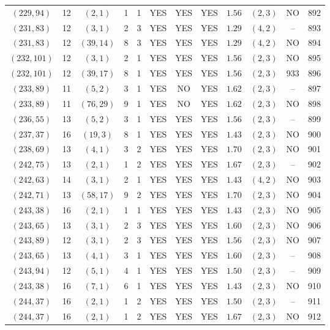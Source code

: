 \begin{longtable}{|c|c|c|c|c|c|c|c|c|c|c|c|}
$(229,94)$ & 12 & $(2,1)$ & 1 & 1 & YES & YES & YES & $1.56$ & $(2,3)$ & NO & 892\\
$(231,83)$ & 12 & $(3,1)$ & 2 & 3 & YES & YES & YES & $1.29$ & $(4,2)$ & -- & 893\\
$(231,83)$ & 12 & $(39,14)$ & 8 & 3 & YES & YES & YES & $1.29$ & $(4,2)$ & NO & 894\\
$(232,101)$ & 12 & $(3,1)$ & 2 & 1 & YES & YES & YES & $1.56$ & $(2,3)$ & NO & 895\\
$(232,101)$ & 12 & $(39,17)$ & 8 & 1 & YES & YES & YES & $1.56$ & $(2,3)$ & 933 & 896\\
$(233,89)$ & 11 & $(5,2)$ & 3 & 1 & YES & NO & YES & $1.62$ & $(2,3)$ & -- & 897\\
$(233,89)$ & 11 & $(76,29)$ & 9 & 1 & YES & NO & YES & $1.62$ & $(2,3)$ & NO & 898\\
$(236,55)$ & 13 & $(5,2)$ & 3 & 1 & YES & YES & YES & $1.56$ & $(2,3)$ & -- & 899\\
$(237,37)$ & 16 & $(19,3)$ & 8 & 1 & YES & YES & YES & $1.43$ & $(2,3)$ & NO & 900\\
$(238,69)$ & 13 & $(4,1)$ & 3 & 2 & YES & YES & YES & $1.70$ & $(2,3)$ & NO & 901\\
$(242,75)$ & 13 & $(2,1)$ & 1 & 2 & YES & YES & YES & $1.67$ & $(2,3)$ & -- & 902\\
$(242,63)$ & 14 & $(3,1)$ & 2 & 1 & YES & YES & YES & $1.43$ & $(4,2)$ & NO & 903\\
$(242,71)$ & 13 & $(58,17)$ & 9 & 2 & YES & YES & YES & $1.70$ & $(2,3)$ & NO & 904\\
$(243,38)$ & 16 & $(2,1)$ & 1 & 1 & YES & YES & YES & $1.43$ & $(2,3)$ & NO & 905\\
$(243,65)$ & 13 & $(3,1)$ & 2 & 3 & YES & YES & YES & $1.60$ & $(2,3)$ & NO & 906\\
$(243,89)$ & 12 & $(3,1)$ & 2 & 3 & YES & YES & YES & $1.56$ & $(2,3)$ & NO & 907\\
$(243,65)$ & 13 & $(4,1)$ & 3 & 1 & YES & YES & YES & $1.60$ & $(2,3)$ & -- & 908\\
$(243,94)$ & 12 & $(5,1)$ & 4 & 1 & YES & YES & YES & $1.50$ & $(2,3)$ & -- & 909\\
$(243,38)$ & 16 & $(7,1)$ & 6 & 1 & YES & YES & YES & $1.43$ & $(2,3)$ & NO & 910\\
$(244,37)$ & 16 & $(2,1)$ & 1 & 2 & YES & YES & YES & $1.50$ & $(2,3)$ & -- & 911\\
$(244,37)$ & 16 & $(2,1)$ & 1 & 2 & YES & YES & YES & $1.67$ & $(2,3)$ & NO & 912\\

\end{longtable}

